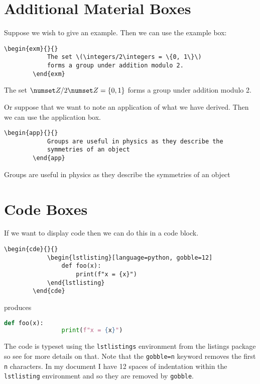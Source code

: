 \documentclass[fleqn, a4paper, openany]{memoir}
\newcommand{\package}[1]{{\textsf{\footnotesize #1}}}  %
\begin{document}
    \section{Additional Material Boxes}
    Suppose we wish to give an example.
    Then we can use the example box:
    \begin{Verbatim}[gobble=2]
        \begin{exm}{}{}
            The set \(\integers/2\integers = \{0, 1\}\)
            forms a group under addition modulo 2.
        \end{exm}
    \end{Verbatim}
    \begin{exm}{}{}
        The set \(\integers/2\integers = \{0, 1\}\) forms a group
        under addition modulo 2.
    \end{exm}
    Or suppose that we want to note an application of what we have derived.
    Then we can use the application box.
    \begin{Verbatim}[gobble=2]
        \begin{app}{}{}
            Groups are useful in physics as they describe the 
            symmetries of an object
        \end{app}
    \end{Verbatim}
    \begin{app}{}{}
        Groups are useful in physics as they describe the 
        symmetries of an object
    \end{app}
    
    \section{Code Boxes}
    If we want to display code then we can do this in a code block.
    \begin{Verbatim}[gobble=2]
        \begin{cde}{}{}
            \begin{lstlisting}[language=python, gobble=12]
                def foo(x):
                    print(f"x = {x}")
            \end{lstlisting}
        \end{cde}
    \end{Verbatim}
    produces
    \begin{cde}{}{}
        \begin{lstlisting}[language=python, gobble=12]
            def foo(x):
                print(f"x = {x}")
        \end{lstlisting}
    \end{cde}
    The code is typeset using the \verb*|lstlistings| environment from the \package{listings} package so see \cite{listings} for more details on that.
    Note that the \verb*|gobble=n| keyword removes the first \verb*|n| characters.
    In my document I have 12 spaces of indentation within the \verb*|lstlisting| environment and so they are removed by \verb*|gobble|.
    
\end{document}
